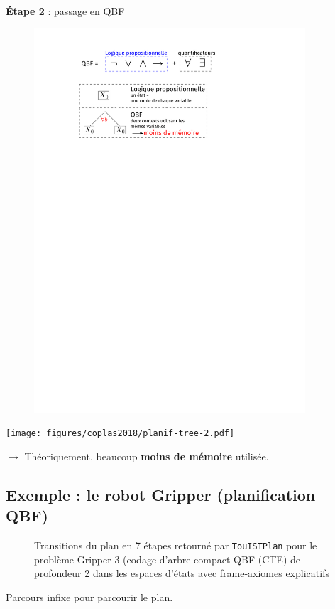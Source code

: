 \documentclass[english,french,usenames,dvipsnames]{beamer}
\newcommand{\touistplan}{{\sc \texttt {TouISTPlan}}\xspace}
\begin{document}
\begin{frame}{\subsecname}
\textbf{Étape 2} : passage en QBF
\begin{figure}
\includegraphics[width=0.9\textwidth]{figures/coplas2018/sat-vs-qbf.pdf}
\end{figure}
\end{frame}

\begin{frame}
\begin{center}\texttt{[image: figures/coplas2018/planif-tree-2.pdf]}\end{center}
$\longrightarrow$ Théoriquement, beaucoup \textbf{moins de mémoire} utilisée.
\end{frame}


\subsection{Exemple : le robot Gripper (planification QBF)}

\begin{frame}{\subsecname}
\begin{figure}[h]\label{gripper3:qbf-efa}
\begin{footnotesize}\end{footnotesize}
\caption{Transitions du plan en 7 étapes retourné par \touistplan{} pour le problème Gripper-3 (codage d'arbre compact QBF (CTE) de profondeur 2 dans les espaces d'états avec frame-axiomes explicatifs}
\end{figure}
Parcours infixe pour parcourir le plan.
\end{frame}
\end{document}
